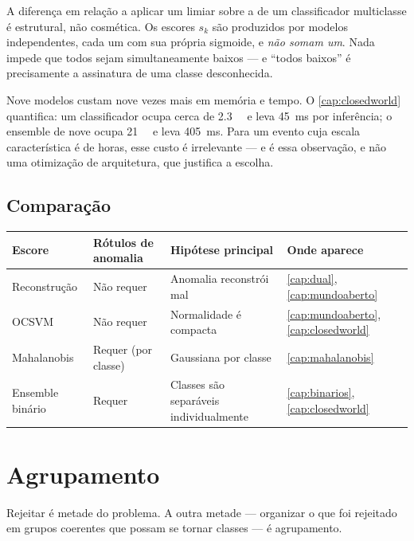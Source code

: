 A diferença em relação a aplicar um limiar sobre a  de um classificador
multiclasse é estrutural, não cosmética. Os escores $s_k$ são produzidos por modelos
independentes, cada um com sua própria sigmoide, e \emph{não somam um}. Nada impede que
todos sejam simultaneamente baixos --- e ``todos baixos'' é precisamente a assinatura de
uma classe desconhecida.

\begin{destaque}
Nove modelos custam nove vezes mais em memória e tempo. O \cref{cap:closedworld}
quantifica: um classificador ocupa cerca de \SI{2,3}{\mega\byte} e leva
\SI{45}{\milli\second} por inferência; o ensemble de nove ocupa \SI{21}{\mega\byte} e
leva \SI{405}{\milli\second}. Para um evento cuja escala característica é de horas, esse
custo é irrelevante --- e é essa observação, e não uma otimização de arquitetura, que
justifica a escolha.
\end{destaque}

\subsection{Comparação}

\begin{center}
\small
\begin{tabular}{p{3.0cm} p{2.4cm} p{3.0cm} p{3.6cm}}
\toprule
\textbf{Escore} & \textbf{Rótulos de anomalia} & \textbf{Hipótese principal} &
\textbf{Onde aparece} \\
\midrule
Reconstrução & Não requer & Anomalia reconstrói mal & \cref{cap:dual},
\cref{cap:mundoaberto} \\
OCSVM        & Não requer & Normalidade é compacta & \cref{cap:mundoaberto},
\cref{cap:closedworld} \\
Mahalanobis  & Requer (por classe) & Gaussiana por classe & \cref{cap:mahalanobis} \\
Ensemble binário & Requer & Classes são separáveis individualmente &
\cref{cap:binarios}, \cref{cap:closedworld} \\
\bottomrule
\end{tabular}
\end{center}

\section{Agrupamento}

Rejeitar é metade do problema. A outra metade --- organizar o que foi rejeitado em
grupos coerentes que possam se tornar classes --- é agrupamento.

